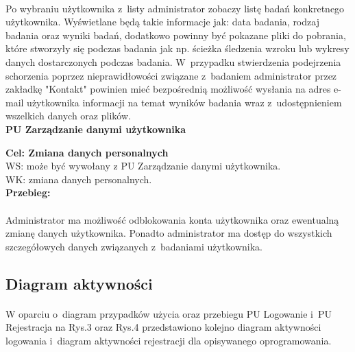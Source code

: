 \documentclass[12pt, letterpaper]{article}
\begin{document}
\paragraph{}Po wybraniu użytkownika z~listy administrator zobaczy listę badań konkretnego użytkownika. Wyświetlane będą takie informacje jak: data badania, rodzaj badania oraz wyniki badań, dodatkowo powinny być pokazane pliki do pobrania, które stworzyły się podczas badania jak np. ścieżka śledzenia wzroku lub wykresy danych dostarczonych podczas badania. W~przypadku stwierdzenia podejrzenia schorzenia poprzez nieprawidłowości związane z~badaniem administrator przez zakładkę "Kontakt" powinien mieć bezpośrednią możliwość wysłania na adres e-mail użytkownika informacji na temat wyników badania wraz z~udostępnieniem wszelkich danych oraz plików.\\
		
		
		\textbf{PU Zarządzanie danymi użytkownika}
		
		\quad
		
		\textbf{Cel: Zmiana danych personalnych}\\
		
		WS: może być wywołany z PU Zarządzanie danymi użytkownika.\\
		
		WK: zmiana danych personalnych.\\
		
		\textbf{Przebieg:}
\paragraph{}Administrator ma możliwość odblokowania konta użytkownika oraz ewentualną zmianę danych użytkownika. Ponadto administrator ma dostęp do wszystkich szczegółowych danych związanych z~badaniami użytkownika.\\

\newpage
\subsection{Diagram aktywności}
\paragraph{}		
W oparciu o~diagram przypadków użycia oraz przebiegu PU Logowanie i~PU Rejestracja na Rys.3 oraz Rys.4 przedstawiono kolejno diagram aktywności logowania i~diagram aktywności rejestracji dla opisywanego oprogramowania.
		
\end{document}

